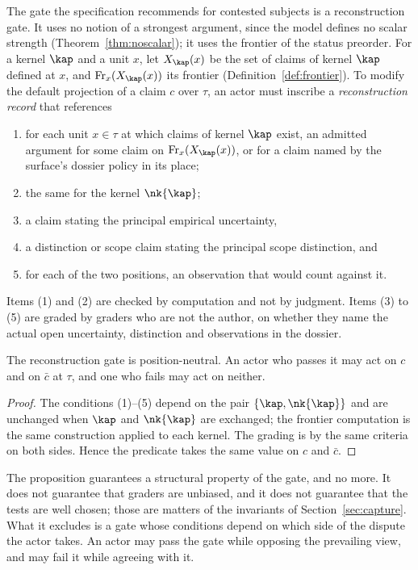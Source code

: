 The gate the specification recommends for contested subjects is a reconstruction gate. It uses no notion of a strongest argument, since the model defines no scalar strength (Theorem~\ref{thm:noscalar}); it uses the frontier of the status preorder. For a kernel $\kap$ and a unit $x$, let $X_\kap(x)$ be the set of claims of kernel $\kap$ defined at $x$, and $\mathrm{Fr}_x(X_\kap(x))$ its frontier (Definition~\ref{def:frontier}). To modify the default projection of a claim $c$ over $\tau$, an actor must inscribe a \emph{reconstruction record} that references
\begin{enumerate}
\item for each unit $x\in\tau$ at which claims of kernel $\kap$ exist, an admitted argument for some claim on $\mathrm{Fr}_x(X_\kap(x))$, or for a claim named by the surface's dossier policy in its place;
\item the same for the kernel $\nk{\kap}$;
\item a claim stating the principal empirical uncertainty,
\item a distinction or scope claim stating the principal scope distinction, and
\item for each of the two positions, an observation that would count against it.
\end{enumerate}
Items (1) and (2) are checked by computation and not by judgment. Items (3) to (5) are graded by graders who are not the author, on whether they name the actual open uncertainty, distinction and observations in the dossier.

\begin{proposition}\label{prop:reconneutral}
The reconstruction gate is position-neutral. An actor who passes it may act on $c$ and on $\bar c$ at $\tau$, and one who fails may act on neither.
\end{proposition}

\begin{proof}
The conditions (1)--(5) depend on the pair $\{\kap,\nk{\kap}\}$ and are unchanged when $\kap$ and $\nk{\kap}$ are exchanged; the frontier computation is the same construction applied to each kernel. The grading is by the same criteria on both sides. Hence the predicate takes the same value on $c$ and $\bar c$.
\end{proof}

The proposition guarantees a structural property of the gate, and no more. It does not guarantee that graders are unbiased, and it does not guarantee that the tests are well chosen; those are matters of the invariants of Section~\ref{sec:capture}. What it excludes is a gate whose conditions depend on which side of the dispute the actor takes. An actor may pass the gate while opposing the prevailing view, and may fail it while agreeing with it.

